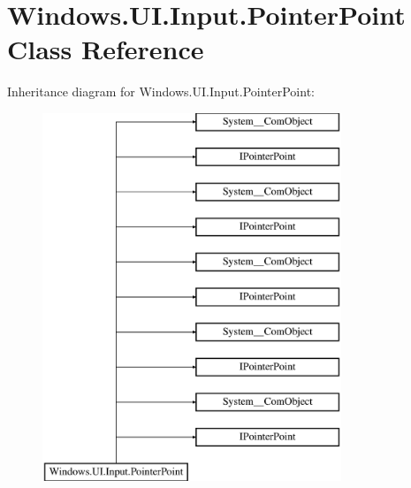 \hypertarget{class_windows_1_1_u_i_1_1_input_1_1_pointer_point}{}\section{Windows.\+U\+I.\+Input.\+Pointer\+Point Class Reference}
\label{class_windows_1_1_u_i_1_1_input_1_1_pointer_point}
Inheritance diagram for Windows.\+U\+I.\+Input.\+Pointer\+Point\+:\begin{figure}[H]
\begin{center}
\leavevmode
\includegraphics[height=11.000000cm]{class_windows_1_1_u_i_1_1_input_1_1_pointer_point}
\end{center}
\end{figure}
